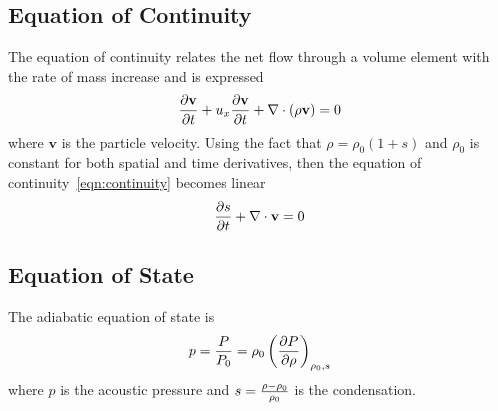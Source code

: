 \documentclass{article}
\begin{document}
\subsection{Equation of Continuity}
The equation of continuity relates the net flow through
a volume element with the rate of mass increase and is expressed
$$
{\partial \mathbf{v}\over\partial t} + u_x{\partial \mathbf{v}\over \partial t} + \nabla \cdot(\rho \mathbf{v}) =0
\label{eqn:continuity}
$$
where $\mathbf{v}$ is the particle velocity.  Using the fact that $\rho
= \rho_0 (1+s)$ and $\rho_0$ is constant for both spatial and time
derivatives, then the  equation of continuity~\ref{eqn:continuity}
becomes linear
$$
{\partial s\over \partial t} + \nabla \cdot \mathbf{v} =0
\label{eqn:linearcontinuity}
$$

\subsection{Equation of State}
The adiabatic equation of state is 
$$  
p={P\over P_0} =\rho_0 \left ({\partial P \over\partial \rho} \right)_{\rho_0, s}
\label{eqn:eosadiabatic}
$$
where $p$ is the acoustic pressure and $s={\rho-\rho_0\over \rho_0}$ is the condensation.  
\end{document}

